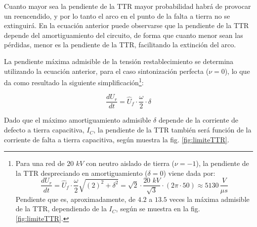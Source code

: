             Cuanto mayor sea la pendiente de la TTR mayor probabilidad habrá de provocar un reencendido, y por lo tanto el arco en el punto de la falta a tierra no se extinguirá. En la ecuación anterior puede observarse que la pendiente de la TTR depende del amortiguamiento del circuito, de forma que cuanto menor sean las pérdidas, menor es la pendiente de la TTR, facilitando la extinción del arco.\newline
            
            La pendiente máxima admisible de la tensión restablecimiento se determina utilizando la ecuación anterior, para el caso sintonización perfecta ($\nu = 0$), lo que da como resultado la siguiente simplificación\footnote{Para una red de $20\textit{ kV}$ con neutro aislado de tierra ($\nu=-1$), la pendiente de la TTR despreciando en amortiguamiento ($\delta=0$) viene dada por:$$\dfrac{dU_\textit{r}}{dt} = \hat U_\textit{f} \cdot \dfrac{\omega}{2}\sqrt{(2)^2+\delta^2} = \sqrt{2}\cdot\dfrac{20\textit{ kV}}{\sqrt{3}}\cdot(2\pi\cdot 50) \approx 5130\,\dfrac{\textit{V}}{\mu\textit{s}}$$ Pendiente que es, aproximadamente, de $4.2$ a $13.5$ veces la máxima admisible de la TTR, dependiendo de la $I_\textit{C}$, según se muestra en la fig. \ref{fig:limiteTTR}.}:

            \begin{equation}
                \dfrac{dU_\textit{r}}{dt} = \hat U_\textit{f} \cdot \dfrac{\omega}{2}\cdot \delta
            \end{equation}

            Dado que el máximo amortiguamiento admisible $\delta$ depende de la corriente de defecto a tierra capacitiva, $I_\textit{C}$, la pendiente de la TTR también será función de la corriente de falta a tierra capacitiva, según muestra la fig. \ref{fig:limiteTTR}.

